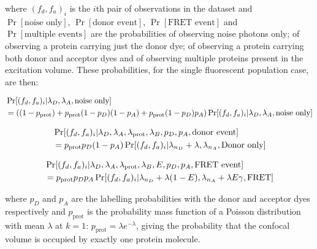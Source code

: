 where $(f_d, f_a)_i$ is the $i$th pair of observations in the dataset and $\Pr[\text{noise only}]$, $\Pr[\text{donor event}]$, $\Pr[\text{FRET event}]$ and $\Pr[\text{multiple events}]$ are the probabilities of observing noise photons only; of observing a protein carrying just the donor dye; of observing a protein carrying both donor and acceptor dyes and of observing multiple proteins present in the excitation volume.  These probabilities, for the single fluorescent population case, are then:   

\begin{equation}
\begin{aligned}
\footnotesize
&\Pr[(f_d, f_a)_i|\lambda_D, \lambda_A, \text{noise only}] \\
&= ((1-p_{\text{prot}}) + p_{\text{prot}}(1-p_D)(1-p_A) + p_{\text{prot}}(1-p_D)p_A)\Pr[(f_d, f_a)_i|\lambda_{D}, \lambda_{A}, \text{noise only}] 
\label{eq:noise_only}
\end{aligned}
\end{equation}

\begin{equation}
\begin{aligned}
\footnotesize
&\Pr[(f_d, f_a)_i|\lambda_D, \lambda_A, \lambda_{\text{prot}}, \lambda_B, p_D, p_A, \text{donor event}] \\
&= p_{\text{prot}}p_D(1-p_A)\Pr[(f_d, f_a)_i|\lambda_{n_D}+\lambda, \lambda_{n_A}, \text{Donor only}] 
\label{eq:donor_only}
\end{aligned}
\end{equation}

\begin{equation}
\begin{aligned}
\footnotesize
&\Pr[(f_d, f_a)_i|\lambda_D, \lambda_A, \lambda_{\text{prot}}, \lambda_B, E, p_D, p_A, \text{FRET event}] \\
&= p_{\text{prot}}p_Dp_A\Pr[(f_d, f_a)_i|\lambda_{n_D}+\lambda(1-E), \lambda_{n_A}+\lambda E \gamma, \text{FRET}]
\label{eq:FRET1} 
\end{aligned}
\end{equation}

where $p_D$ and $p_A$ are the labelling probabilities with the donor and acceptor dyes respectively and $p_{\text{prot}}$ is the probability mass function of a Poisson distribution with mean $\lambda$ at $k=1$: $p_{\text{prot}}=\lambda e^{-\lambda}$, giving the probability that the confocal volume is occupied by exactly one protein molecule.

